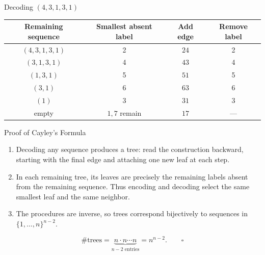 \documentclass[aspectratio=169,11pt]{beamer}
\begin{document}
\begin{frame}{Decoding $(4,3,1,3,1)$}
\normalsize
\begin{center}\renewcommand{\arraystretch}{1.3}\begin{tabular}{c|c|c|c}Remaining sequence&Smallest absent label&Add edge&Remove label\\\hline
$(4,3,1,3,1)$&2&$24$&2\\$(3,1,3,1)$&4&$43$&4\\$(1,3,1)$&5&$51$&5\\$(3,1)$&6&$63$&6\\$(1)$&3&$31$&3\\empty&$1,7$ remain&$17$&---\end{tabular}\end{center}\begin{center}\end{center}
\end{frame}

\begin{frame}{Proof of Cayley's Formula}
\normalsize
\begin{enumerate}
\setlength{\itemsep}{0.22cm}
\item Decoding any sequence produces a tree: read the construction backward, starting with the final edge and attaching one new leaf at each step.
\item In each remaining tree, its leaves are precisely the remaining labels absent from the remaining sequence. Thus encoding and decoding select the same smallest leaf and the same neighbor.
\item The procedures are inverse, so trees correspond bijectively to sequences in $\{1,\ldots,n\}^{n-2}$.
\end{enumerate}\[\#\text{trees}=\underbrace{n\cdot n\cdots n}_{n-2\text{ entries}}=n^{n-2}.\qquad\square\]
\end{frame}
\end{document}

